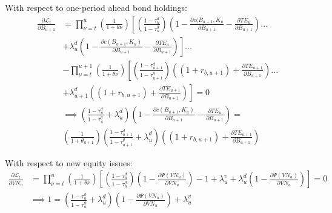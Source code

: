 With respect to one-period ahead bond holdings:
 \begin{equation}
\label{eqn:foc_b}
\begin{split}
 \frac{\partial \mathcal{L}_{t}}{\partial B_{u+1}}  &=  \prod_{\nu=t}^{u}\left(\frac{1}{1+\theta{\nu}}\right)\left[\left(\frac{1-\tau^{d}_{u}}{1-\tau^{g}_{u}}\right)\left(1-\frac{\partial c(B_{u+1},K_{u}}{\partial B_{u+1}}-\frac{\partial TE_{u}}{\partial B_{u+1}}\right) ... \right. \\
 & \left. +  \lambda^{d}_{u}\left(1-\frac{\partial c(B_{u+1},K_{u})}{\partial B_{u+1}}-\frac{\partial TE_{u}}{\partial B_{u+1}}\right) \right] ... \\
 & -  \prod_{\nu=t}^{u+1}\left(\frac{1}{1+\theta{\nu}}\right)\left[\left(\frac{1-\tau^{d}_{u+1}}{1-\tau^{g}_{u+1}}\right)\left((1+r_{b,u+1})+\frac{\partial TE_{u+1}}{\partial B_{u+1}}\right)... \right. \\
 & \left. + \lambda^{d}_{u+1}\left((1+r_{b,u+1})+\frac{\partial TE_{u+1}}{\partial B_{u+1}}\right)\right] = 0 \\
& \implies \left(\frac{1-\tau^{d}_{u}}{1-\tau^{g}_{u}} + \lambda^{d}_{u} \right)\left(1-\frac{\partial c(B_{u+1},K_{u})}{\partial B_{u+1}}-\frac{\partial TE_{u}}{\partial B_{u+1}}\right)= \\
&  \left(\frac{1}{1+\theta_{u+1}}\right) \left(\frac{1-\tau^{d}_{u+1}}{1-\tau^{g}_{u+1}} + \lambda^{d}_{u} \right) \left((1+r_{b,u+1})+\frac{\partial TE_{u+1}}{\partial B_{u+1}}\right)
 \end{split}
\end{equation}

With respect to new equity issues:
 \begin{equation}
\label{eqn:foc_vn}
\begin{split}
 \frac{\partial \mathcal{L}_{t}}{\partial VN_{u}}  &=  \prod_{\nu=t}^{u}\left(\frac{1}{1+\theta{\nu}}\right)\left[\left(\frac{1-\tau^{d}_{u}}{1-\tau^{g}_{u}}\right)\left(1-\frac{\partial \Psi(VN_{u})}{\partial VN_{u}}\right) - 1 + \lambda^{v}_{u} + \lambda^{d}_{u}\left(1-\frac{\partial \Psi(VN_{u})}{\partial VN_{u}}\right) \right] = 0 \\
 & \implies 1 = \left(\frac{1-\tau^{d}_{u}}{1-\tau^{g}_{u}} + \lambda^{d}_{u}\right)\left(1-\frac{\partial \Psi(VN_{u})}{\partial VN_{u}}\right) + \lambda^{v}_{u}
 \end{split}
\end{equation}

